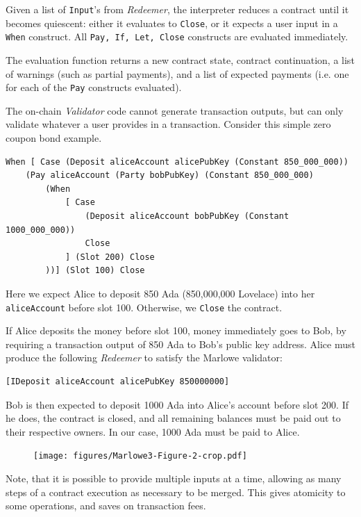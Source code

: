 \documentclass[runningheads]{llncs}
\begin{document}
Given a list of \texttt{Input}'s from \emph{Redeemer}, the interpreter reduces a contract until it becomes quiescent: either it evaluates to \texttt{Close},
or it expects a user input in a \texttt{When} construct.
All \texttt{Pay, If, Let, Close} constructs are evaluated immediately.

The evaluation function returns a new contract state, contract continuation, a list of warnings (such as partial payments),
and a list of expected payments (i.e. one for each of the \texttt{Pay} constructs evaluated).

The on-chain \emph{Validator} code cannot generate transaction outputs,
but can only validate whatever a user provides in a transaction.
Consider this simple zero coupon bond example.

\begin{verbatim}
When [ Case (Deposit aliceAccount alicePubKey (Constant 850_000_000))
    (Pay aliceAccount (Party bobPubKey) (Constant 850_000_000)
        (When
            [ Case
                (Deposit aliceAccount bobPubKey (Constant 1000_000_000))
                Close
            ] (Slot 200) Close
        ))] (Slot 100) Close
\end{verbatim}

\noindent
Here we expect Alice to deposit 850 Ada (850,000,000 Lovelace) into her \texttt{aliceAccount} before slot 100.
Otherwise, we \texttt{Close} the contract.

If Alice deposits the money before slot 100, money immediately goes to Bob,
by requiring a transaction output of 850 Ada to Bob's public key address.
Alice must produce the following \emph{Redeemer} to satisfy the Marlowe validator:

\begin{verbatim}
[IDeposit aliceAccount alicePubKey 850000000]
\end{verbatim}

\noindent
Bob is then expected to deposit 1000 Ada into Alice's account before slot 200.
If he does, the contract is closed, and all remaining balances must be paid out
to their respective owners. In our case, 1000 Ada must be paid to Alice.

\begin{figure}[!h]
    \centering
    \texttt{[image: figures/Marlowe3-Figure-2-crop.pdf]}
\end{figure}

Note, that it is possible to provide multiple inputs at a time,
allowing as many steps of a contract execution as necessary to be merged.
This gives atomicity to some operations, and saves on transaction fees.
\end{document}

